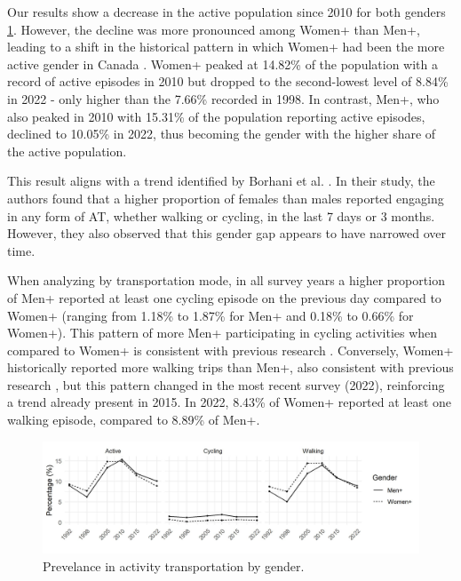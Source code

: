 \documentclass[preprint, 3p,
authoryear]{elsarticle} %
\begin{document}
Our results show a decrease in the active population since 2010 for both
genders \ref{fig:gender-perc-figure}. However, the decline was more
pronounced among Women+ than Men+, leading to a shift in the historical
pattern in which Women+ had been the more active gender in Canada
\citep{bryan2009, borhani2024}. Women+ peaked at 14.82\% of the
population with a record of active episodes in 2010 but dropped to the
second-lowest level of 8.84\% in 2022 - only higher than the 7.66\%
recorded in 1998. In contrast, Men+, who also peaked in 2010 with
15.31\% of the population reporting active episodes, declined to 10.05\%
in 2022, thus becoming the gender with the higher share of the active
population.

This result aligns with a trend identified by Borhani et al.
\citeyearpar{borhani2024}. In their study, the authors found that a
higher proportion of females than males reported engaging in any form of
AT, whether walking or cycling, in the last 7 days or 3 months. However,
they also observed that this gender gap appears to have narrowed over
time.

When analyzing by transportation mode, in all survey years a higher
proportion of Men+ reported at least one cycling episode on the previous
day compared to Women+ (ranging from 1.18\% to 1.87\% for Men+ and
0.18\% to 0.66\% for Women+). This pattern of more Men+ participating in
cycling activities when compared to Women+ is consistent with previous
research \citep{heesch2012, bryan2009, borhani2024}. Conversely, Women+
historically reported more walking trips than Men+, also consistent with
previous research \citep{goel2023, pollard2017, bryan2009, borhani2024},
but this pattern changed in the most recent survey (2022), reinforcing a
trend already present in 2015. In 2022, 8.43\% of Women+ reported at
least one walking episode, compared to 8.89\% of Men+.

\begin{figure}
\includegraphics[width=1\linewidth]{figures/active_pop_gender_graph} \caption{Prevelance in activity transportation by gender.}\label{fig:gender-perc-figure}
\end{figure}
\end{document}
